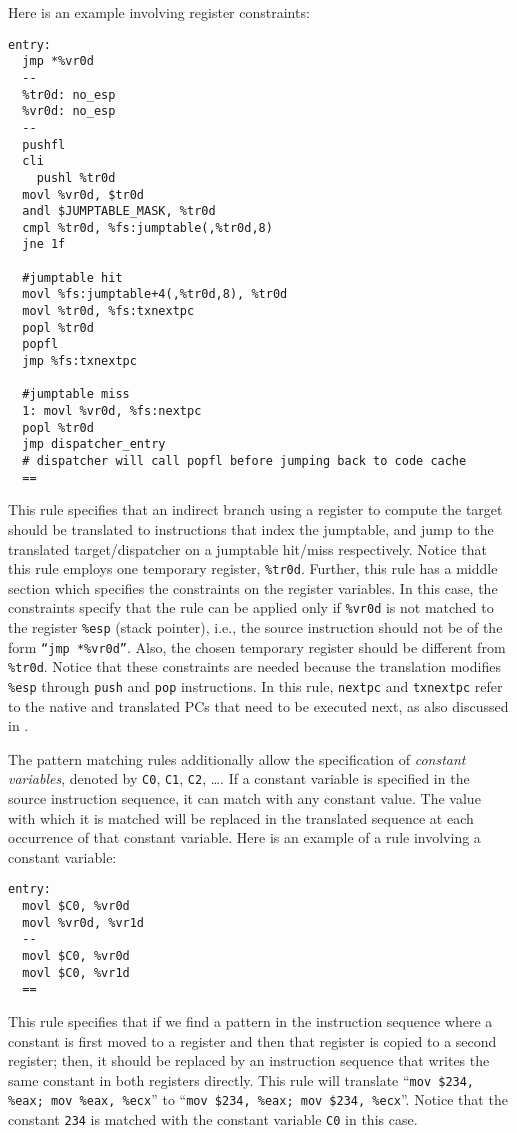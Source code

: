 \documentclass[9pt]{article}
\begin{document}
Here is an example involving register constraints:
\begin{verbatim}
entry:
  jmp *%vr0d
  --
  %tr0d: no_esp
  %vr0d: no_esp
  --
  pushfl
  cli
	pushl %tr0d
  movl %vr0d, $tr0d
  andl $JUMPTABLE_MASK, %tr0d
  cmpl %tr0d, %fs:jumptable(,%tr0d,8)
  jne 1f

  #jumptable hit
  movl %fs:jumptable+4(,%tr0d,8), %tr0d
  movl %tr0d, %fs:txnextpc
  popl %tr0d
  popfl
  jmp %fs:txnextpc

  #jumptable miss
  1: movl %vr0d, %fs:nextpc
  popl %tr0d
  jmp dispatcher_entry
  # dispatcher will call popfl before jumping back to code cache
  ==
\end{verbatim}
This rule specifies that an indirect branch using a register to
compute the target should be translated to instructions that index
the jumptable, and jump to the translated target/dispatcher on a
jumptable hit/miss respectively. Notice that this rule employs one
temporary register, {\tt \%tr0d}. Further, this rule has
a middle section which specifies the constraints on the register
variables. In this case, the constraints specify that
the rule can be applied only if {\tt \%vr0d}
is not matched to the register {\tt \%esp} (stack pointer), i.e., the
source instruction should not be of the form {\tt ``jmp *\%vr0d''}. Also,
the chosen temporary register should be different from {\tt \%tr0d}. Notice
that these constraints are needed because the translation modifies
{\tt \%esp} through {\tt push} and {\tt pop} instructions.
In this rule, {\tt nextpc} and {\tt txnextpc} refer to the native
and translated PCs that need to be executed next, as also discussed
in \cite{sosp13}.

The pattern matching rules additionally allow the specification of
{\em constant variables}, denoted by {\tt C0}, {\tt C1}, {\tt C2}, \ldots.
If a constant variable is specified in the source instruction sequence,
it can match with any constant value. The value with which it is matched
will be replaced in the translated sequence at each occurrence of that
constant variable. Here is an example of a rule involving a constant
variable:
\begin{verbatim}
entry:
  movl $C0, %vr0d
  movl %vr0d, %vr1d
  --
  movl $C0, %vr0d
  movl $C0, %vr1d
  ==
\end{verbatim}
This rule specifies that if we find a pattern in the instruction sequence
where a constant is first moved to a register and then that register is
copied to a second register; then, it should be replaced by an instruction
sequence that writes the same constant in both registers directly. This
rule will translate ``{\tt mov \$234, \%eax; mov \%eax, \%ecx}'' to
``{\tt mov \$234, \%eax; mov \$234, \%ecx}''. Notice that the constant
{\tt 234} is matched with the constant variable {\tt C0} in this case.
\end{document}
